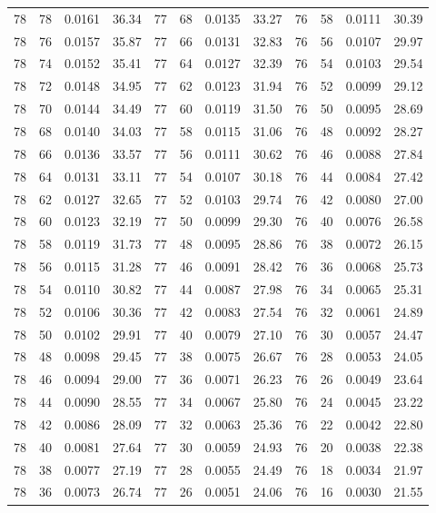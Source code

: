 \begin{tabular}{llll|llll|llll}
78 & 78 & 0.0161 & 36.34 & 77 & 68 & 0.0135 & 33.27 & 76 & 58 & 0.0111 & 30.39\\
78 & 76 & 0.0157 & 35.87 & 77 & 66 & 0.0131 & 32.83 & 76 & 56 & 0.0107 & 29.97\\
78 & 74 & 0.0152 & 35.41 & 77 & 64 & 0.0127 & 32.39 & 76 & 54 & 0.0103 & 29.54\\
78 & 72 & 0.0148 & 34.95 & 77 & 62 & 0.0123 & 31.94 & 76 & 52 & 0.0099 & 29.12\\
78 & 70 & 0.0144 & 34.49 & 77 & 60 & 0.0119 & 31.50 & 76 & 50 & 0.0095 & 28.69\\
78 & 68 & 0.0140 & 34.03 & 77 & 58 & 0.0115 & 31.06 & 76 & 48 & 0.0092 & 28.27\\
78 & 66 & 0.0136 & 33.57 & 77 & 56 & 0.0111 & 30.62 & 76 & 46 & 0.0088 & 27.84\\
78 & 64 & 0.0131 & 33.11 & 77 & 54 & 0.0107 & 30.18 & 76 & 44 & 0.0084 & 27.42\\
78 & 62 & 0.0127 & 32.65 & 77 & 52 & 0.0103 & 29.74 & 76 & 42 & 0.0080 & 27.00\\
78 & 60 & 0.0123 & 32.19 & 77 & 50 & 0.0099 & 29.30 & 76 & 40 & 0.0076 & 26.58\\
78 & 58 & 0.0119 & 31.73 & 77 & 48 & 0.0095 & 28.86 & 76 & 38 & 0.0072 & 26.15\\
78 & 56 & 0.0115 & 31.28 & 77 & 46 & 0.0091 & 28.42 & 76 & 36 & 0.0068 & 25.73\\
78 & 54 & 0.0110 & 30.82 & 77 & 44 & 0.0087 & 27.98 & 76 & 34 & 0.0065 & 25.31\\
78 & 52 & 0.0106 & 30.36 & 77 & 42 & 0.0083 & 27.54 & 76 & 32 & 0.0061 & 24.89\\
78 & 50 & 0.0102 & 29.91 & 77 & 40 & 0.0079 & 27.10 & 76 & 30 & 0.0057 & 24.47\\
78 & 48 & 0.0098 & 29.45 & 77 & 38 & 0.0075 & 26.67 & 76 & 28 & 0.0053 & 24.05\\
78 & 46 & 0.0094 & 29.00 & 77 & 36 & 0.0071 & 26.23 & 76 & 26 & 0.0049 & 23.64\\
78 & 44 & 0.0090 & 28.55 & 77 & 34 & 0.0067 & 25.80 & 76 & 24 & 0.0045 & 23.22\\
78 & 42 & 0.0086 & 28.09 & 77 & 32 & 0.0063 & 25.36 & 76 & 22 & 0.0042 & 22.80\\
78 & 40 & 0.0081 & 27.64 & 77 & 30 & 0.0059 & 24.93 & 76 & 20 & 0.0038 & 22.38\\
78 & 38 & 0.0077 & 27.19 & 77 & 28 & 0.0055 & 24.49 & 76 & 18 & 0.0034 & 21.97\\
78 & 36 & 0.0073 & 26.74 & 77 & 26 & 0.0051 & 24.06 & 76 & 16 & 0.0030 & 21.55\\

\end{tabular}
